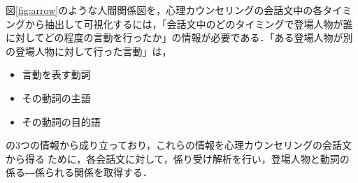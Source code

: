\documentclass[shuuron]{kuee}
\begin{document}
%
%
%
%




%


図\ref{fig:arrow}のような人間関係図を，心理カウンセリングの会話文中の各タイミングから抽出して可視化するには，「会話文中のどのタイミングで登場人物が誰に対してどの程度の言動を行ったか」の情報が必要である．「ある登場人物が別の登場人物に対して行った言動」は，
\begin{itemize}
  \item 言動を表す動詞
  \item その動詞の主語
  \item その動詞の目的語
\end{itemize}
の3つの情報から成り立っており，これらの情報を心理カウンセリングの会話文から得るために，各会話文に対して，係り受け解析を行い，登場人物と動詞の係る―係られる関係を取得する．
\end{document}
